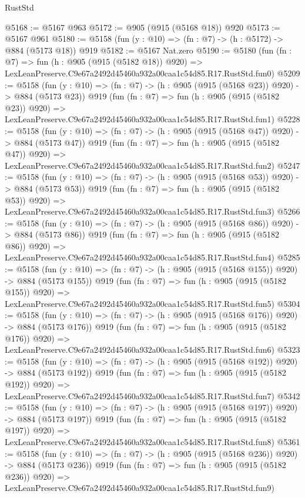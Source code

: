 \begin{lexlean}{RustStd}
\begin{coremodule}
@5168 := @5167 @963
@5172 := @905 (@915 (@5168 @18)) @920
@5173 := @5167 @961
@5180 := @5158 (fun (y : @10) => (fn : @7) -> (h : @5172) -> @884 (@5173 @18)) @919
@5182 := @5167 Nat.zero
@5190 := @5180
    (fun (fn : @7) =>
    fun (h : @905 (@915 (@5182 @18)) @920) =>
    LexLeanPreserve.C9e67a2492d45460a932a00caa1c54d85.R17.RustStd.fun0)
@5209 := @5158
    (fun (y : @10) => (fn : @7) -> (h : @905 (@915 (@5168 @23)) @920) -> @884 (@5173 @23))
    @919
    (fun (fn : @7) =>
    fun (h : @905 (@915 (@5182 @23)) @920) =>
    LexLeanPreserve.C9e67a2492d45460a932a00caa1c54d85.R17.RustStd.fun1)
@5228 := @5158
    (fun (y : @10) => (fn : @7) -> (h : @905 (@915 (@5168 @47)) @920) -> @884 (@5173 @47))
    @919
    (fun (fn : @7) =>
    fun (h : @905 (@915 (@5182 @47)) @920) =>
    LexLeanPreserve.C9e67a2492d45460a932a00caa1c54d85.R17.RustStd.fun2)
@5247 := @5158
    (fun (y : @10) => (fn : @7) -> (h : @905 (@915 (@5168 @53)) @920) -> @884 (@5173 @53))
    @919
    (fun (fn : @7) =>
    fun (h : @905 (@915 (@5182 @53)) @920) =>
    LexLeanPreserve.C9e67a2492d45460a932a00caa1c54d85.R17.RustStd.fun3)
@5266 := @5158
    (fun (y : @10) => (fn : @7) -> (h : @905 (@915 (@5168 @86)) @920) -> @884 (@5173 @86))
    @919
    (fun (fn : @7) =>
    fun (h : @905 (@915 (@5182 @86)) @920) =>
    LexLeanPreserve.C9e67a2492d45460a932a00caa1c54d85.R17.RustStd.fun4)
@5285 := @5158
    (fun (y : @10) => (fn : @7) -> (h : @905 (@915 (@5168 @155)) @920) -> @884 (@5173 @155))
    @919
    (fun (fn : @7) =>
    fun (h : @905 (@915 (@5182 @155)) @920) =>
    LexLeanPreserve.C9e67a2492d45460a932a00caa1c54d85.R17.RustStd.fun5)
@5304 := @5158
    (fun (y : @10) => (fn : @7) -> (h : @905 (@915 (@5168 @176)) @920) -> @884 (@5173 @176))
    @919
    (fun (fn : @7) =>
    fun (h : @905 (@915 (@5182 @176)) @920) =>
    LexLeanPreserve.C9e67a2492d45460a932a00caa1c54d85.R17.RustStd.fun6)
@5323 := @5158
    (fun (y : @10) => (fn : @7) -> (h : @905 (@915 (@5168 @192)) @920) -> @884 (@5173 @192))
    @919
    (fun (fn : @7) =>
    fun (h : @905 (@915 (@5182 @192)) @920) =>
    LexLeanPreserve.C9e67a2492d45460a932a00caa1c54d85.R17.RustStd.fun7)
@5342 := @5158
    (fun (y : @10) => (fn : @7) -> (h : @905 (@915 (@5168 @197)) @920) -> @884 (@5173 @197))
    @919
    (fun (fn : @7) =>
    fun (h : @905 (@915 (@5182 @197)) @920) =>
    LexLeanPreserve.C9e67a2492d45460a932a00caa1c54d85.R17.RustStd.fun8)
@5361 := @5158
    (fun (y : @10) => (fn : @7) -> (h : @905 (@915 (@5168 @236)) @920) -> @884 (@5173 @236))
    @919
    (fun (fn : @7) =>
    fun (h : @905 (@915 (@5182 @236)) @920) =>
    LexLeanPreserve.C9e67a2492d45460a932a00caa1c54d85.R17.RustStd.fun9)

\end{coremodule}
\end{lexlean}
